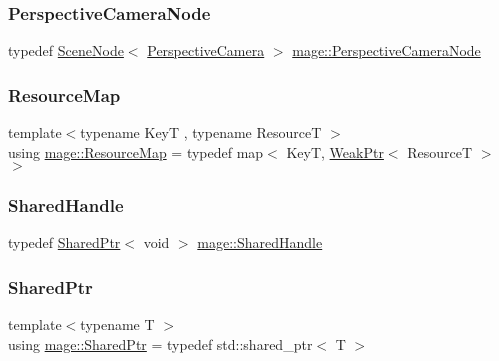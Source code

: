 \hypertarget{namespacemage_a4542f24699be53c2f30040ce575155a7}{}\label{namespacemage_a4542f24699be53c2f30040ce575155a7} 
\subsubsection{\texorpdfstring{Perspective\+Camera\+Node}{PerspectiveCameraNode}}
{\footnotesize\ttfamily typedef \hyperlink{classmage_1_1_scene_node}{Scene\+Node}$<$ \hyperlink{classmage_1_1_perspective_camera}{Perspective\+Camera} $>$ \hyperlink{namespacemage_a4542f24699be53c2f30040ce575155a7}{mage\+::\+Perspective\+Camera\+Node}}

\hypertarget{namespacemage_a0b0a087ad59dd4aa0b4b538d8caec216}{}\label{namespacemage_a0b0a087ad59dd4aa0b4b538d8caec216} 
\subsubsection{\texorpdfstring{Resource\+Map}{ResourceMap}}
{\footnotesize\ttfamily template$<$typename KeyT , typename ResourceT $>$ \\
using \hyperlink{namespacemage_a0b0a087ad59dd4aa0b4b538d8caec216}{mage\+::\+Resource\+Map} = typedef map$<$ KeyT, \hyperlink{namespacemage_aa159a63c0d58464bdf32dfe419dd5dc1}{Weak\+Ptr}$<$ ResourceT $>$ $>$}

\hypertarget{namespacemage_ab892828913d6129acf71e0cec60467e5}{}\label{namespacemage_ab892828913d6129acf71e0cec60467e5} 
\subsubsection{\texorpdfstring{Shared\+Handle}{SharedHandle}}
{\footnotesize\ttfamily typedef \hyperlink{namespacemage_a1e01ae66713838a7a67d30e44c67703e}{Shared\+Ptr}$<$ void $>$ \hyperlink{namespacemage_ab892828913d6129acf71e0cec60467e5}{mage\+::\+Shared\+Handle}}

\hypertarget{namespacemage_a1e01ae66713838a7a67d30e44c67703e}{}\label{namespacemage_a1e01ae66713838a7a67d30e44c67703e} 
\subsubsection{\texorpdfstring{Shared\+Ptr}{SharedPtr}}
{\footnotesize\ttfamily template$<$typename T $>$ \\
using \hyperlink{namespacemage_a1e01ae66713838a7a67d30e44c67703e}{mage\+::\+Shared\+Ptr} = typedef std\+::shared\+\_\+ptr$<$ T $>$}


